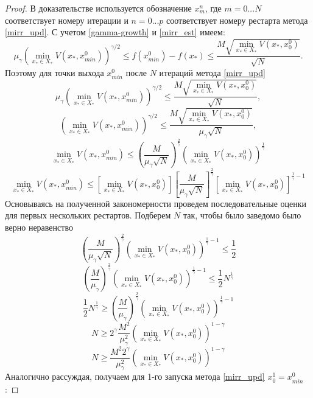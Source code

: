     \begin{proof}
       В доказательстве используется обозначение $x_m^n$, где $m = 0...N$ соответствует номеру итерации и $n = 0...p$ соответствует номеру рестарта метода \eqref{mirr_upd}. С учетом \eqref{gamma-growth} и \eqref{mirr_est} имеем: 
       $$
           \mu_{\gamma}\left(\min\limits_{x_* \in X_*}{V(x_*, x_{min}^0)}\right)^{\gamma/2} \leq f(x_{min}^0) - f(x_*) \leq \frac{M\sqrt{\min\limits_{x_* \in X_*}{V(x_*, x_0^0)}}}{\sqrt{N}}.
       $$
       Поэтому для точки выхода $x_{min}^0$ после $N$ итераций метода \eqref{mirr_upd}
       $$
           \mu_{\gamma}\left(\min\limits_{x_* \in X_*}{V(x_*, x_{min}^0)}\right)^{\gamma/2} \leq \frac{M\sqrt{\min\limits_{x_* \in X_*}{V(x_*, x_0^0)}}}{\sqrt{N}},
       $$
       $$
           \left(\min\limits_{x_* \in X_*}{V(x_*, x_{min}^0)}\right)^{\gamma/2} \leq \frac{M\sqrt{\min\limits_{x_* \in X_*}{V(x_*, x_0^0)}}}{\mu_{\gamma}\sqrt{N}},
       $$
       $$
           \min\limits_{x_* \in X_*}{V(x_*, x_{min}^0)} \leq \left(\frac{M}{\mu_{\gamma}\sqrt{N}}\right)^{\frac{2}{\gamma}} \left(\min\limits_{x_* \in X_*}{V(x_*, x_0^0)}\right)^{\frac{1}{\gamma}}
       $$
       $$
           \min\limits_{x_* \in X_*}{V(x_*, x_{min}^0)} \leq \left[\min\limits_{x_* \in X_*}{V(x_*, x_0^0)} \right] \left[\frac{M}{\mu_{\gamma}\sqrt{N}}\right]^{\frac{2}{\gamma}} \left[\min\limits_{x_* \in X_*}{V(x_*, x_0^0)}\right]^{\frac{1}{\gamma} - 1}
       $$
       Основываясь на полученной закономерности проведем последовательные оценки для первых нескольких рестартов. Подберем $N$ так, чтобы было заведомо было верно неравенство
       $$
           \left(\frac{M}{\mu_{\gamma}\sqrt{N}}\right)^{\frac{2}{\gamma}} \left(\min\limits_{x_* \in X_*}{V(x_*, x_0^0)}\right)^{\frac{1}{\gamma} - 1} \leq \frac{1}{2} 
       $$
       $$
           \left(\frac{M}{\mu_{\gamma}}\right)^{\frac{2}{\gamma}} \left(\min\limits_{x_* \in X_*}{V(x_*, x_0^0)}\right)^{\frac{1}{\gamma} - 1} \leq \frac{1}{2} N^{\frac{1}{\gamma}} 
       $$
       $$
           \frac{1}{2} N^{\frac{1}{\gamma}} \geq \left(\frac{M}{\mu_{\gamma}}\right)^{\frac{2}{\gamma}} \left(\min\limits_{x_* \in X_*}{V(x_*, x_0^0)}\right)^{\frac{1}{\gamma} - 1}  
       $$
       $$
           N \geq 2 ^ {\gamma} \frac{M^2}{\mu_{\gamma}^2} \left(\min\limits_{x_* \in X_*}{V(x_*, x_0^0)}\right)^{1 - \gamma}  
       $$
       $$
           N \geq \frac{M^2 2^{\gamma}}{\mu_{\gamma}^2} \left(\min\limits_{x_* \in X_*}{V(x_*, x_0^0)}\right)^{1 - \gamma}  
       $$
       Аналогично рассуждая, получаем для 1-го запуска метода \eqref{mirr_upd} $x_0^1 = x_{min}^0$:

\end{proof}
